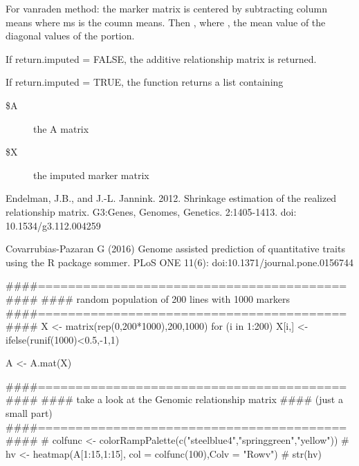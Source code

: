 \documentclass[a4paper]{book}
\begin{document}
%
\begin{Details}\relax

For vanraden method: the marker matrix is centered by subtracting column means  where ms is the coumn means. Then , where , the mean value of the diagonal values of the  portion.

\end{Details}
%
\begin{Value}
If return.imputed = FALSE, the  additive relationship matrix is returned.

If return.imputed = TRUE, the function returns a list containing
\begin{description}

\item[\$A] the A matrix
\item[\$X] the imputed marker matrix

\end{description}

\end{Value}
%
\begin{References}\relax

Endelman, J.B., and J.-L. Jannink. 2012. Shrinkage estimation of the realized relationship matrix. G3:Genes, Genomes, Genetics. 2:1405-1413. doi: 10.1534/g3.112.004259

Covarrubias-Pazaran G (2016) Genome assisted prediction of quantitative traits using the R package sommer. PLoS ONE 11(6): doi:10.1371/journal.pone.0156744 

\end{References}
%
\begin{Examples}
\begin{ExampleCode}
####=========================================####
#### random population of 200 lines with 1000 markers
####=========================================####
X <- matrix(rep(0,200*1000),200,1000)
for (i in 1:200) {
  X[i,] <- ifelse(runif(1000)<0.5,-1,1)
}

A <- A.mat(X)

####=========================================####
#### take a look at the Genomic relationship matrix 
#### (just a small part)
####=========================================####
# colfunc <- colorRampPalette(c("steelblue4","springgreen","yellow"))
# hv <- heatmap(A[1:15,1:15], col = colfunc(100),Colv = "Rowv")
# str(hv)
\end{ExampleCode}
\end{Examples}
\end{document}
